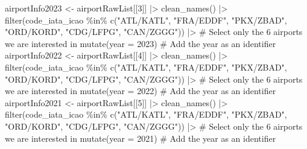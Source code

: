 \documentclass[
  letterpaper,
  DIV=11,
  numbers=noendperiod]{scrartcl}
\newenvironment{Shaded}{\begin{snugshade}}{\end{snugshade}}
\newcommand{\AttributeTok}[1]{\textcolor[rgb]{0.40,0.45,0.13}{#1}}
\newcommand{\CommentTok}[1]{\textcolor[rgb]{0.37,0.37,0.37}{#1}}
\newcommand{\DecValTok}[1]{\textcolor[rgb]{0.68,0.00,0.00}{#1}}
\newcommand{\FunctionTok}[1]{\textcolor[rgb]{0.28,0.35,0.67}{#1}}
\newcommand{\NormalTok}[1]{\textcolor[rgb]{0.00,0.23,0.31}{#1}}
\newcommand{\OtherTok}[1]{\textcolor[rgb]{0.00,0.23,0.31}{#1}}
\newcommand{\SpecialCharTok}[1]{\textcolor[rgb]{0.37,0.37,0.37}{#1}}
\newcommand{\StringTok}[1]{\textcolor[rgb]{0.13,0.47,0.30}{#1}}
\begin{document}
\begin{Shaded}
\begin{Highlighting}[]
\NormalTok{airportInfo2023 }\OtherTok{\textless{}{-}}\NormalTok{ airportRawList[[}\DecValTok{3}\NormalTok{]] }\SpecialCharTok{|\textgreater{}}
  \FunctionTok{clean\_names}\NormalTok{() }\SpecialCharTok{|\textgreater{}}
  \FunctionTok{filter}\NormalTok{(}\StringTok{\textasciigrave{}}\AttributeTok{code\_iata\_icao}\StringTok{\textasciigrave{}} \SpecialCharTok{\%in\%} \FunctionTok{c}\NormalTok{(}\StringTok{"ATL/KATL"}\NormalTok{, }\StringTok{"FRA/EDDF"}\NormalTok{, }\StringTok{"PKX/ZBAD"}\NormalTok{, }
                                 \StringTok{"ORD/KORD"}\NormalTok{, }\StringTok{"CDG/LFPG"}\NormalTok{, }\StringTok{"CAN/ZGGG"}\NormalTok{)) }\SpecialCharTok{|\textgreater{}} 
  \CommentTok{\# Select only the 6 airports we are interested in}
  \FunctionTok{mutate}\NormalTok{(}\AttributeTok{year =} \DecValTok{2023}\NormalTok{) }\CommentTok{\# Add the year as an identifier}
\NormalTok{airportInfo2022 }\OtherTok{\textless{}{-}}\NormalTok{ airportRawList[[}\DecValTok{4}\NormalTok{]] }\SpecialCharTok{|\textgreater{}}
  \FunctionTok{clean\_names}\NormalTok{() }\SpecialCharTok{|\textgreater{}}
  \FunctionTok{filter}\NormalTok{(}\StringTok{\textasciigrave{}}\AttributeTok{code\_iata\_icao}\StringTok{\textasciigrave{}} \SpecialCharTok{\%in\%} \FunctionTok{c}\NormalTok{(}\StringTok{"ATL/KATL"}\NormalTok{, }\StringTok{"FRA/EDDF"}\NormalTok{, }\StringTok{"PKX/ZBAD"}\NormalTok{, }
                                 \StringTok{"ORD/KORD"}\NormalTok{, }\StringTok{"CDG/LFPG"}\NormalTok{, }\StringTok{"CAN/ZGGG"}\NormalTok{)) }\SpecialCharTok{|\textgreater{}} 
  \CommentTok{\# Select only the 6 airports we are interested in}
  \FunctionTok{mutate}\NormalTok{(}\AttributeTok{year =} \DecValTok{2022}\NormalTok{) }\CommentTok{\# Add the year as an identifier}
\NormalTok{airportInfo2021 }\OtherTok{\textless{}{-}}\NormalTok{ airportRawList[[}\DecValTok{5}\NormalTok{]] }\SpecialCharTok{|\textgreater{}}
  \FunctionTok{clean\_names}\NormalTok{() }\SpecialCharTok{|\textgreater{}}
  \FunctionTok{filter}\NormalTok{(}\StringTok{\textasciigrave{}}\AttributeTok{code\_iata\_icao}\StringTok{\textasciigrave{}} \SpecialCharTok{\%in\%} \FunctionTok{c}\NormalTok{(}\StringTok{"ATL/KATL"}\NormalTok{, }\StringTok{"FRA/EDDF"}\NormalTok{, }\StringTok{"PKX/ZBAD"}\NormalTok{, }
                                 \StringTok{"ORD/KORD"}\NormalTok{, }\StringTok{"CDG/LFPG"}\NormalTok{, }\StringTok{"CAN/ZGGG"}\NormalTok{)) }\SpecialCharTok{|\textgreater{}} 
  \CommentTok{\# Select only the 6 airports we are interested in}
  \FunctionTok{mutate}\NormalTok{(}\AttributeTok{year =} \DecValTok{2021}\NormalTok{) }\CommentTok{\# Add the year as an identifier}

\end{Highlighting}
\end{Shaded}
\end{document}
